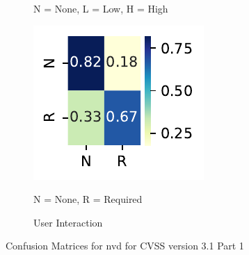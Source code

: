 \documentclass[12pt]{article}
\begin{document}
\begin{figure}
\begin{subfigure}[b]{0.45\textwidth}
		\begin{tablenotes}
			\footnotesize
			\item \quad N = None, L = Low, H = High
		\end{tablenotes}
	\end{subfigure}
	\hfill
	\begin{subfigure}[b]{0.45\textwidth}
		\includegraphics[width=\textwidth]{./figures/confusion_matrices/user_interaction_nvd.pdf}

		\caption{User Interaction}
		\begin{tablenotes}
			\footnotesize
			\item \quad N = None, R = Required
		\end{tablenotes}
	\end{subfigure}

	\caption{\label{fig:nvd_31_confusion_matrices_1}Confusion Matrices for nvd for CVSS version 3.1 Part 1}
\end{figure}
\end{document}

